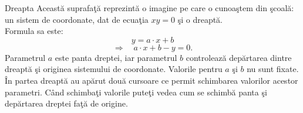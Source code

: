 \begin{surferPage}[Dreapta]{Dreapta}
Aceast\u a suprafa\c t\u a reprezint\u a o imagine pe care o cunoa\c stem din \c scoal\u a: un sistem de coordonate, dat de ecua\c tia $xy=0$ \c si o dreapt\u a. \\ Formula sa este:
\[y=a\cdot x + b\]
\[ \Rightarrow \quad a\cdot x +b -y=0.\]
Parametrul $a$ este panta dreptei, iar parametrul $b$ controleaz\u a dep\u artarea dintre dreapt\u a \c si originea sistemului de coordonate.
\newline \newline
Valorile pentru  $a$ \c si $b$ nu sunt fixate. \^In partea dreapt\u a au ap\u arut dou\u a cursoare ce permit schimbarea valorilor acestor parametri. C\^and schimba\c ti valorile pute\c ti vedea cum se schimb\u a panta \c si dep\u artarea dreptei fa\c t\u a de origine.
\end{surferPage}